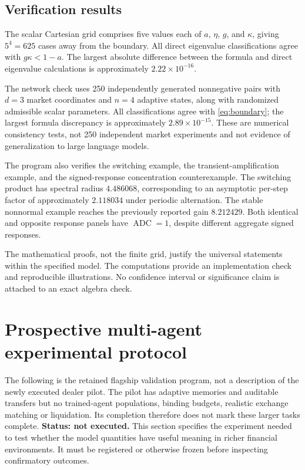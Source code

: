 \documentclass[11pt,a4paper]{article}
\theoremstyle{definition}
\theoremstyle{remark}
\newcommand{\ADC}{\operatorname{ADC}}
\begin{document}
\subsection{Verification results}
The scalar Cartesian grid comprises five values each of $a$, $\eta$, $g$, and $\kappa$, giving $5^4=625$ cases away from the boundary. All direct eigenvalue classifications agree with $g\kappa<1-a$. The largest absolute difference between the formula and direct eigenvalue calculations is approximately $2.22\times10^{-16}$.

The network check uses 250 independently generated nonnegative pairs with $d=3$ market coordinates and $n=4$ adaptive states, along with randomized admissible scalar parameters. All classifications agree with \cref{eq:boundary}; the largest formula discrepancy is approximately $2.89\times10^{-15}$. These are numerical consistency tests, not 250 independent market experiments and not evidence of generalization to large language models.

The program also verifies the switching example, the transient-amplification example, and the signed-response concentration counterexample. The switching product has spectral radius $4.486068$, corresponding to an asymptotic per-step factor of approximately $2.118034$ under periodic alternation. The stable nonnormal example reaches the previously reported gain $8.212429$. Both identical and opposite response panels have $\ADC=1$, despite different aggregate signed responses.

The mathematical proofs, not the finite grid, justify the universal statements within the specified model. The computations provide an implementation check and reproducible illustrations. No confidence interval or significance claim is attached to an exact algebra check.

\section{Prospective multi-agent experimental protocol}
The following is the retained flagship validation program, not a description of the newly executed dealer pilot. The pilot has adaptive memories and auditable transfers but no trained-agent populations, binding budgets, realistic exchange matching or liquidation. Its completion therefore does not mark these larger tasks complete.
\label{sec:experiments}
\textbf{Status: not executed.} This section specifies the experiment needed to test whether the model quantities have useful meaning in richer financial environments. It must be registered or otherwise frozen before inspecting confirmatory outcomes.
\end{document}

